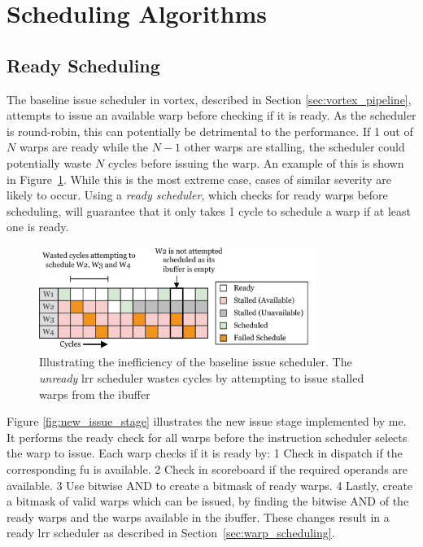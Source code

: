 \section{Scheduling Algorithms}

\subsection{Ready Scheduling} \label{sec:ready_scheduling}

The baseline issue scheduler in \Gls{vortex}, described in Section \ref{sec:vortex_pipeline}, attempts to issue an available warp before checking if it is ready. As the scheduler is round-robin, this can potentially be detrimental to the performance. If 1 out of $N$ warps are ready while the $N-1$ other warps are stalling, the scheduler could potentially waste $N$ cycles before issuing the warp. An example of this is shown in Figure~\ref{fig:unready_lrr}. While this is the most extreme case, cases of similar severity are likely to occur. Using a \textit{ready scheduler}, which checks for ready warps before scheduling, will guarantee that it only takes 1 cycle to schedule a warp if at least one is ready.

\begin{figure}
    \centering
    \includegraphics[width=0.8\textwidth]{figures/old_lrr_scheduler.png}
    \caption{Illustrating the inefficiency of the baseline issue scheduler. The \textit{unready} \acrshort{lrr} scheduler wastes cycles by attempting to issue stalled warps from the ibuffer}
    \label{fig:unready_lrr}
\end{figure}

Figure \ref{fig:new_issue_stage} illustrates the new issue stage implemented by me. It performs the ready check for all warps before the instruction scheduler selects the warp to issue. Each warp checks if it is ready by: \textcircled{\small{1}} Check in dispatch if the corresponding \acrshort{fu} is available. \textcircled{\small{2}} Check in scoreboard if the required operands are available. \textcircled{\small{3}} Use bitwise AND to create a bitmask of ready warps. \textcircled{\small{4}} Lastly, create a bitmask of valid warps which can be issued, by finding the bitwise AND of the ready warps and the warps available in the ibuffer. These changes result in a ready \acrfull{lrr} scheduler as described in Section~\ref{sec:warp_scheduling}.

